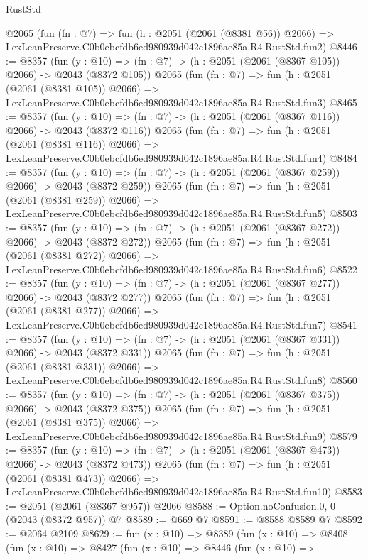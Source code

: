\begin{lexlean}{RustStd}
\begin{coremodule}
    @2065
    (fun (fn : @7) =>
    fun (h : @2051 (@2061 (@8381 @56)) @2066) =>
    LexLeanPreserve.C0b0ebcfdb6ed980939d042c1896ae85a.R4.RustStd.fun2)
@8446 := @8357
    (fun (y : @10) => (fn : @7) -> (h : @2051 (@2061 (@8367 @105)) @2066) -> @2043 (@8372 @105))
    @2065
    (fun (fn : @7) =>
    fun (h : @2051 (@2061 (@8381 @105)) @2066) =>
    LexLeanPreserve.C0b0ebcfdb6ed980939d042c1896ae85a.R4.RustStd.fun3)
@8465 := @8357
    (fun (y : @10) => (fn : @7) -> (h : @2051 (@2061 (@8367 @116)) @2066) -> @2043 (@8372 @116))
    @2065
    (fun (fn : @7) =>
    fun (h : @2051 (@2061 (@8381 @116)) @2066) =>
    LexLeanPreserve.C0b0ebcfdb6ed980939d042c1896ae85a.R4.RustStd.fun4)
@8484 := @8357
    (fun (y : @10) => (fn : @7) -> (h : @2051 (@2061 (@8367 @259)) @2066) -> @2043 (@8372 @259))
    @2065
    (fun (fn : @7) =>
    fun (h : @2051 (@2061 (@8381 @259)) @2066) =>
    LexLeanPreserve.C0b0ebcfdb6ed980939d042c1896ae85a.R4.RustStd.fun5)
@8503 := @8357
    (fun (y : @10) => (fn : @7) -> (h : @2051 (@2061 (@8367 @272)) @2066) -> @2043 (@8372 @272))
    @2065
    (fun (fn : @7) =>
    fun (h : @2051 (@2061 (@8381 @272)) @2066) =>
    LexLeanPreserve.C0b0ebcfdb6ed980939d042c1896ae85a.R4.RustStd.fun6)
@8522 := @8357
    (fun (y : @10) => (fn : @7) -> (h : @2051 (@2061 (@8367 @277)) @2066) -> @2043 (@8372 @277))
    @2065
    (fun (fn : @7) =>
    fun (h : @2051 (@2061 (@8381 @277)) @2066) =>
    LexLeanPreserve.C0b0ebcfdb6ed980939d042c1896ae85a.R4.RustStd.fun7)
@8541 := @8357
    (fun (y : @10) => (fn : @7) -> (h : @2051 (@2061 (@8367 @331)) @2066) -> @2043 (@8372 @331))
    @2065
    (fun (fn : @7) =>
    fun (h : @2051 (@2061 (@8381 @331)) @2066) =>
    LexLeanPreserve.C0b0ebcfdb6ed980939d042c1896ae85a.R4.RustStd.fun8)
@8560 := @8357
    (fun (y : @10) => (fn : @7) -> (h : @2051 (@2061 (@8367 @375)) @2066) -> @2043 (@8372 @375))
    @2065
    (fun (fn : @7) =>
    fun (h : @2051 (@2061 (@8381 @375)) @2066) =>
    LexLeanPreserve.C0b0ebcfdb6ed980939d042c1896ae85a.R4.RustStd.fun9)
@8579 := @8357
    (fun (y : @10) => (fn : @7) -> (h : @2051 (@2061 (@8367 @473)) @2066) -> @2043 (@8372 @473))
    @2065
    (fun (fn : @7) =>
    fun (h : @2051 (@2061 (@8381 @473)) @2066) =>
    LexLeanPreserve.C0b0ebcfdb6ed980939d042c1896ae85a.R4.RustStd.fun10)
@8583 := @2051 (@2061 (@8367 @957)) @2066
@8588 := Option.noConfusion.{0, 0} (@2043 (@8372 @957)) @7
@8589 := @669 @7
@8591 := @8588 @8589 @7
@8592 := @2064 @2109
@8629 := fun (x : @10) =>
  @8389
    (fun (x : @10) =>
    @8408
      (fun (x : @10) =>
      @8427
        (fun (x : @10) =>
        @8446
          (fun (x : @10) =>

\end{coremodule}
\end{lexlean}
